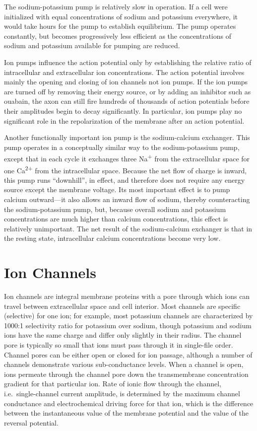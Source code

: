The sodium-potassium pump is relatively slow in operation. If a cell were initialized with equal concentrations of sodium and potassium everywhere, it would take hours for the pump to establish equilibrium. The pump operates constantly, but becomes progressively less efficient as the concentrations of sodium and potassium available for pumping are reduced.

Ion pumps influence the action potential only by establishing the relative ratio of intracellular and extracellular ion concentrations. The action potential involves mainly the opening and closing of ion channels not ion pumps. If the ion pumps are turned off by removing their energy source, or by adding an inhibitor such as ouabain, the axon can still fire hundreds of thousands of action potentials before their amplitudes begin to decay significantly. In particular, ion pumps play no significant role in the repolarization of the membrane after an action potential.

Another functionally important ion pump is the sodium-calcium exchanger. This pump operates in a conceptually similar way to the sodium-potassium pump, except that in each cycle it exchanges three Na\textsuperscript{+} from the extracellular space for one Ca\textsuperscript{2+} from the intracellular space. Because the net flow of charge is inward, this pump runs ``downhill'', in effect, and therefore does not require any energy source except the membrane voltage. Its most important effect is to pump calcium outward---it also allows an inward flow of sodium, thereby counteracting the sodium-potassium pump, but, because overall sodium and potassium concentrations are much higher than calcium concentrations, this effect is relatively unimportant. The net result of the sodium-calcium exchanger is that in the resting state, intracellular calcium concentrations become very low.

\hypertarget{ion-channels}{%
\section{Ion Channels}\label{ion-channels}}

Ion channels are integral membrane proteins with a pore through which ions can travel between extracellular space and cell interior. Most channels are specific (selective) for one ion; for example, most potassium channels are characterized by 1000:1 selectivity ratio for potassium over sodium, though potassium and sodium ions have the same charge and differ only slightly in their radius. The channel pore is typically so small that ions must pass through it in single-file order. Channel pores can be either open or closed for ion passage, although a number of channels demonstrate various sub-conductance levels. When a channel is open, ions permeate through the channel pore down the transmembrane concentration gradient for that particular ion. Rate of ionic flow through the channel, i.e.~single-channel current amplitude, is determined by the maximum channel conductance and electrochemical driving force for that ion, which is the difference between the instantaneous value of the membrane potential and the value of the reversal potential.

